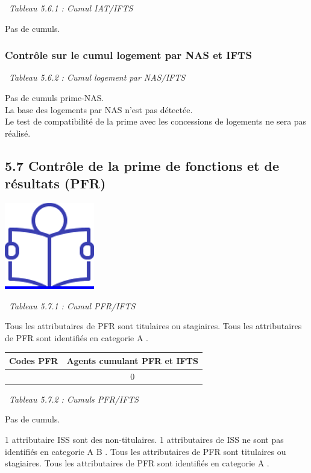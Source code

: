 ~\emph{Tableau 5.6.1 : Cumul IAT/IFTS}

Pas de cumuls.

\hypertarget{controle-sur-le-cumul-logement-par-nas-et-ifts}{%
\subsubsection{Contrôle sur le cumul logement par NAS et
IFTS}\label{controle-sur-le-cumul-logement-par-nas-et-ifts}}

~\emph{Tableau 5.6.2 : Cumul logement par NAS/IFTS}

Pas de cumuls prime-NAS.\\
La base des logements par NAS n'est pas détectée.\\
Le test de compatibilité de la prime avec les concessions de logements
ne sera pas réalisé.

\hypertarget{controle-de-la-prime-de-fonctions-et-de-resultats-pfr}{%
\subsection{5.7 Contrôle de la prime de fonctions et de résultats
(PFR)}\label{controle-de-la-prime-de-fonctions-et-de-resultats-pfr}}

\href{../Docs/Notices/fiche_PFR.odt}{\includegraphics{icones/Notice.png}}

~\emph{Tableau 5.7.1 : Cumul PFR/IFTS}

Tous les attributaires de PFR sont titulaires ou stagiaires. Tous les
attributaires de PFR sont identifiés en categorie A .

\begin{longtable}[]{@{}cc@{}}
\toprule
Codes PFR & Agents cumulant PFR et IFTS\tabularnewline
\midrule
\endhead
& 0\tabularnewline
\bottomrule
\end{longtable}

~\emph{Tableau 5.7.2 : Cumuls PFR/IFTS}

Pas de cumuls.

1 attributaire ISS sont des non-titulaires. 1 attributaires de ISS ne
sont pas identifiés en categorie A B . Tous les attributaires de PFR
sont titulaires ou stagiaires. Tous les attributaires de PFR sont
identifiés en categorie A .

